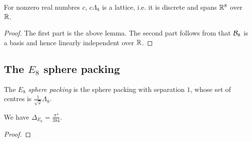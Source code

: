 \begin{lemma}\label{instLatticeE8}\leanok
  For nonzero real numbres $c$, $c\Lambda_8$ is a lattice, i.e. it is discrete and spans $\mathbb{R}^8$ over $\mathbb{R}$.
\end{lemma}
\begin{proof}\leanok
  The first part is the above lemma. The second part follows from that $\mathcal{B}_8$ is a basis and hence linearly independent over $\mathbb{R}$.
\end{proof}


\subsection{The $E_8$ sphere packing}

\begin{definition}\label{E8.E8Packing}\leanok
  The \emph{$E_8$ sphere packing} is the sphere packing with separation $1$, whose set of centres is $\frac{1}{\sqrt{2}}\Lambda_8$.
\end{definition}

\begin{theorem}\label{E8Packing-density}
  We have $\Delta_{E_8} = \frac{\pi^4}{384}$.
\end{theorem}
\begin{proof}
\end{proof}

